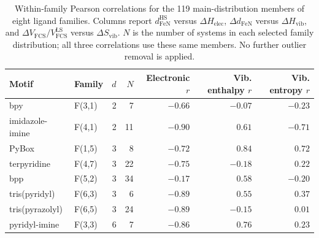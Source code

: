 \begin{table}[htbp]
\centering
\small
\setlength{\tabcolsep}{4pt}
\caption{Within-family Pearson correlations for the 119 main-distribution members of eight ligand families. Columns report $d_{\mathrm{FeN}}^{\mathrm{HS}}$ versus $\Delta H_{\mathrm{elec}}$, $\Delta d_{\mathrm{FeN}}$ versus $\Delta H_{\mathrm{vib}}$, and $\Delta V_{\mathrm{FCS}}/V_{\mathrm{FCS}}^{\mathrm{LS}}$ versus $\Delta S_{\mathrm{vib}}$. $N$ is the number of systems in each selected family distribution; all three correlations use these same members. No further outlier removal is applied.}
\label{tab:family-structural-correlations}
\begin{tabular}{@{}llrrrrr@{}}
\toprule
Motif & Family & $d$ & $N$ & Electronic $r$ & Vib. enthalpy $r$ & Vib. entropy $r$ \\
\midrule
bpy & F(3,1) & 2 & 7 & $-0.66$ & $-0.07$ & $-0.23$ \\
imidazole-imine & F(4,1) & 2 & 11 & $-0.90$ & $0.61$ & $-0.71$ \\
PyBox & F(1,5) & 3 & 8 & $-0.72$ & $0.84$ & $0.72$ \\
terpyridine & F(4,7) & 3 & 22 & $-0.75$ & $-0.18$ & $0.22$ \\
bpp & F(5,2) & 3 & 34 & $-0.17$ & $0.58$ & $-0.20$ \\
tris(pyridyl) & F(6,3) & 3 & 6 & $-0.89$ & $0.55$ & $0.37$ \\
tris(pyrazolyl) & F(6,5) & 3 & 24 & $-0.89$ & $-0.15$ & $0.01$ \\
pyridyl-imine & F(3,3) & 6 & 7 & $-0.86$ & $0.76$ & $0.23$ \\
\bottomrule
\end{tabular}
\end{table}
